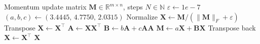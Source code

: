 \begin{algorithm}[H]
\caption{Newton--Schulz}
\label{Alg:NS}
\begin{algorithmic}[1]
\REQUIRE Momentum update matrix $\mathbf{M} \in \mathbb{R}^{m \times n}$, steps $N \in \mathbb{N}$
\STATE $\varepsilon \leftarrow 1e-7$
\STATE $(a,b,c) \leftarrow (3.4445,\, 4.7750, \, 2.0315)$
\STATE Normalize $\mathbf{X} \leftarrow \mathbf{M} / (\|\mathbf{M}\|_F + \varepsilon)$
    \STATE Transpose $\mathbf{X} \leftarrow \mathbf{X}^\top$
\ENDIF
{}
    \STATE      $\mathbf{A} \leftarrow \mathbf{X} \mathbf{X}^\top$
    \STATE      $\mathbf{B} \leftarrow b \mathbf{A} + c\mathbf{A} \mathbf{A}$
    \STATE      $\mathbf{M} \leftarrow a\mathbf{X} + \mathbf{B} \mathbf{X}$
\ENDFOR
{} 
    \STATE Transpose back $\mathbf{X} \leftarrow \mathbf{X}^\top$
\ENDIF
\RETURN $\mathbf{X}$
\end{algorithmic}
\end{algorithm}

